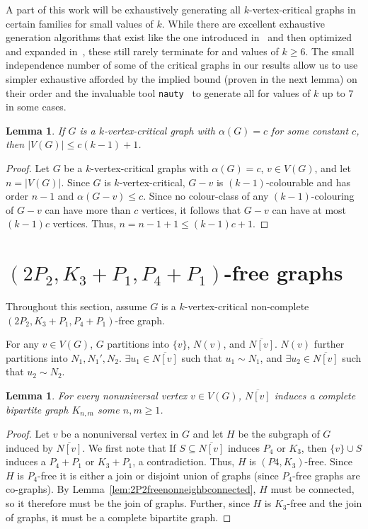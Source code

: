 \documentclass[11pt]{article}
\newtheorem{lemma}[theorem]{Lemma}
\theoremstyle{definition}
\newcommand{\forbid}{$(2P_2, K_3+P_1,P_4+P_1)$}
\newcommand{\noneighbs}{\overline{N[v]}}
\begin{document}
A part of this work will be exhaustively generating all $k$-vertex-critical graphs in certain families for small values of $k$. While there are excellent exhaustive generation algorithms that exist like the one introduced in~\cite{Hoang2015} and then optimized and expanded in~\cite{GoedgebeurSchaudt2018}, these still rarely terminate for and values of $k\ge 6$. The small independence number of some of the critical graphs in our results allow us to use simpler exhaustive afforded by the implied bound (proven in the next lemma) on their order and the invaluable tool \texttt{nauty}~\cite{nauty} to generate all for values of $k$ up to $7$ in some cases.

\begin{lemma}\label{lem:kcritindnumboundonorder}
If $G$ is a $k$-vertex-critical graph with $\alpha(G)=c$ for some constant $c$, then $|V(G)|\le c(k-1)+1$.
\end{lemma}
\begin{proof}
Let $G$ be a $k$-vertex-critical graphs with $\alpha(G)=c$, $v\in V(G)$, and let $n=|V(G)|$. Since $G$ is $k$-vertex-critical, $G-v$ is $(k-1)$-colourable and has order $n-1$ and $\alpha(G-v)\le c$. Since no colour-class of any $(k-1)$-colouring of $G-v$ can have more than $c$ vertices, it follows that $G-v$ can have at most $(k-1)c$ vertices. Thus, $n=n-1+1 \le (k-1)c+1$.
\end{proof}

\section{\forbid-free graphs}

Throughout this section, assume $G$ is a $k$-vertex-critical non-complete \forbid -free graph.

For any $v\in V(G)$, $G$ partitions into $\{v\}$, $N(v)$, and $\overline{N[v]}$. $N(v)$ further partitions into $N_1, N_1', N_2$. $\exists u_1 \in \noneighbs$ such that $u_1 \sim N_1$, and $\exists u_2 \in \noneighbs$ such that $u_2 \sim N_2$.

\begin{lemma}\label{lem:completebipartite}
For every nonuniversal vertex $v\in V(G)$,  $\noneighbs$ induces a complete bipartite graph $K_{n,m}$ some $n,m\ge 1$.
\end{lemma}
\begin{proof}
Let $v$ be a nonuniversal vertex in $G$ and let $H$ be the subgraph of $G$ induced by $\noneighbs$. We first note that If $S\subseteq\noneighbs$ induces $P_4$ or $K_3$, then $\{v\}\cup S$ induces a $P_4+P_1$ or $K_3+P_1$, a contradiction. Thus, $H$ is $(P4, K_3)$-free. Since $H$ is $P_4$-free it is either a join or disjoint union of graphs (since $P_4$-free graphs are co-graphs). By Lemma~\ref{lem:2P2freenonneighbconnected}, $H$ must be connected, so it therefore must be the join of graphs. Further, since $H$ is $K_3$-free and the join of graphs, it must be a complete bipartite graph. 
\end{proof}
\end{document}
